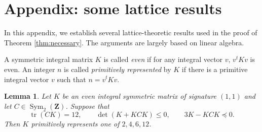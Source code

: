 \documentclass[12pt]{amsart}
\numberwithin{equation}{section}
\newtheorem{lemma}[theorem]{Lemma}
\theoremstyle{definition}
\theoremstyle{remark}
\newcommand{\Z}{\mathbf Z}
\newcommand{\Sym}{\operatorname{Sym}}
\newcommand{\tr}{\operatorname{tr}}
\begin{document}
\section{Appendix: some lattice results}
In this appendix, we establish several lattice-theoretic results used in the proof of Theorem \ref{thm:necessary}. The arguments are largely based on linear algebra.

A symmetric integral matrix $K$ is called \emph{even} if for any integral vector $v$, $v^tKv$ is even. An integer $n$ is called \emph{primitively represented} by $K$ if there is a primitive integral vector $v$ such that $n = v^tKv$.
\begin{lemma}\label{lem:binary-tensor}
Let $K$ be an even integral symmetric matrix of signature $(1,1)$ and let
$C\in\Sym_2(\Z)$.  Suppose that
\begin{equation}\label{hypothesis-binary}
     \tr(CK)=12,\qquad
 \det(K+KCK)\leq0,\qquad
 3K-KCK\preceq0.
\end{equation}
Then $K$ primitively represents one of $2,4,6,12$.
\end{lemma}
\end{document}

